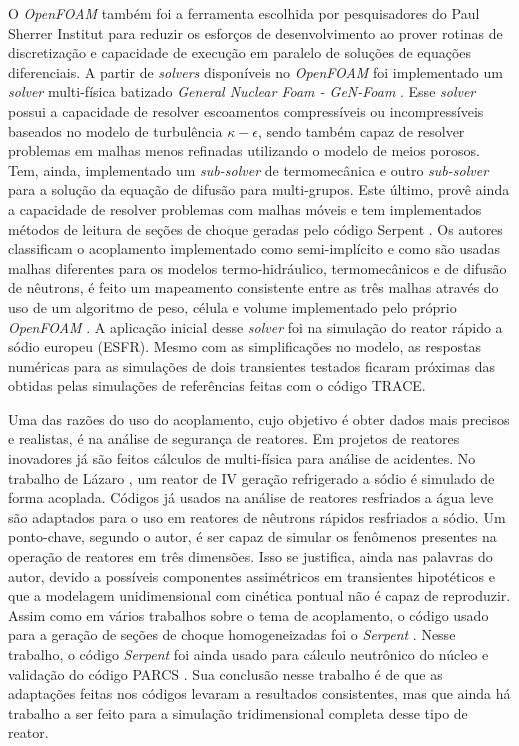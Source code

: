 O \textit{OpenFOAM} também foi a ferramenta escolhida por pesquisadores do Paul Sherrer
Institut para reduzir os esforços de desenvolvimento ao prover rotinas de discretização
e capacidade de execução em paralelo de soluções de equações diferenciais. A partir
de \textit{solvers} disponíveis no \textit{OpenFOAM} foi implementado um \textit{solver}
multi-física batizado \textit{General Nuclear Foam - GeN-Foam} \cite{Fiorina2015}.
Esse \textit{solver}
possui a capacidade de resolver escoamentos compressíveis ou incompressíveis baseados
no modelo de turbulência $\kappa-\epsilon$, sendo também capaz de resolver
problemas em malhas menos refinadas utilizando o modelo de meios porosos. Tem, ainda,
implementado um \textit{sub-solver} de termomecânica e outro \textit{sub-solver} para
a solução da equação de difusão para multi-grupos. Este último, provê ainda a capacidade
de resolver problemas com malhas móveis e tem implementados métodos de leitura de seções
de choque geradas pelo código Serpent \cite{Serpent2013}. Os autores classificam
o acoplamento implementado como semi-implícito e como são usadas malhas diferentes para
os modelos termo-hidráulico, termomecânicos e de difusão de nêutrons, é feito um mapeamento
consistente entre as três malhas através do uso de um algoritmo de peso, célula e volume
implementado pelo próprio \textit{OpenFOAM} \cite{OpenFOAM2015}. A aplicação inicial desse
\textit{solver} foi na simulação do reator rápido a sódio europeu (ESFR). Mesmo com as
simplificações no modelo, as respostas numéricas para as simulações de dois transientes
testados ficaram próximas das obtidas pelas simulações de referências feitas com o
código TRACE.

Uma das razões do uso do acoplamento, cujo objetivo é obter dados mais precisos e realistas, é na 
análise de segurança de reatores. Em projetos de reatores inovadores já são feitos cálculos de multi-física para 
análise de acidentes. No trabalho de Lázaro \cite{Lazaro2013}, um reator de IV geração refrigerado a sódio 
é simulado de forma acoplada. Códigos já usados na análise de reatores resfriados a água leve são adaptados 
para o uso em reatores de nêutrons rápidos resfriados a sódio. Um ponto-chave, segundo o autor, é ser capaz 
de simular os fenômenos presentes na operação de reatores em três dimensões. Isso se justifica, ainda nas 
palavras do autor, devido a possíveis componentes assimétricos em transientes hipotéticos e que 
a modelagem unidimensional com cinética pontual não é capaz de reproduzir. Assim como em vários trabalhos 
sobre o tema de acoplamento, o código usado para a geração de seções de choque homogeneizadas 
foi o \textit{Serpent} \cite{Serpent2013}. Nesse trabalho, o código \textit{Serpent} foi ainda usado 
para cálculo neutrônico do núcleo e validação do código PARCS \cite{PARCS2006}. Sua conclusão nesse trabalho 
é de que as adaptações feitas nos códigos levaram a resultados consistentes, mas que ainda há trabalho 
a ser feito para a simulação tridimensional completa desse tipo de reator.

